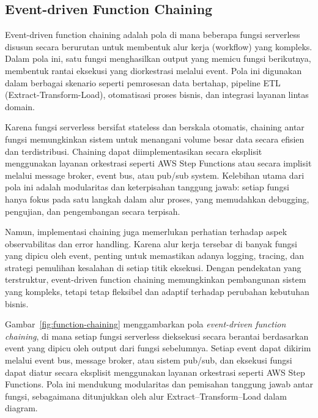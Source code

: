 \subsection{Event-driven Function Chaining}

Event-driven function chaining adalah pola di mana beberapa fungsi serverless disusun secara berurutan untuk membentuk alur kerja (workflow) yang kompleks. Dalam pola ini, satu fungsi menghasilkan output yang memicu fungsi berikutnya, membentuk rantai eksekusi yang diorkestrasi melalui event. Pola ini digunakan dalam berbagai skenario seperti pemrosesan data bertahap, pipeline ETL (Extract-Transform-Load), otomatisasi proses bisnis, dan integrasi layanan lintas domain.

Karena fungsi serverless bersifat stateless dan berskala otomatis, chaining antar fungsi memungkinkan sistem untuk menangani volume besar data secara efisien dan terdistribusi. Chaining dapat diimplementasikan secara eksplisit menggunakan layanan orkestrasi seperti AWS Step Functions atau secara implisit melalui message broker, event bus, atau pub/sub system. Kelebihan utama dari pola ini adalah modularitas dan keterpisahan tanggung jawab: setiap fungsi hanya fokus pada satu langkah dalam alur proses, yang memudahkan debugging, pengujian, dan pengembangan secara terpisah.

Namun, implementasi chaining juga memerlukan perhatian terhadap aspek observabilitas dan error handling. Karena alur kerja tersebar di banyak fungsi yang dipicu oleh event, penting untuk memastikan adanya logging, tracing, dan strategi pemulihan kesalahan di setiap titik eksekusi. Dengan pendekatan yang terstruktur, event-driven function chaining memungkinkan pembangunan sistem yang kompleks, tetapi tetap fleksibel dan adaptif terhadap perubahan kebutuhan bisnis.

Gambar~\ref{fig:function-chaining} menggambarkan pola \textit{event-driven function chaining}, di mana setiap fungsi serverless dieksekusi secara berantai berdasarkan event yang dipicu oleh output dari fungsi sebelumnya. Setiap event dapat dikirim melalui event bus, message broker, atau sistem pub/sub, dan eksekusi fungsi dapat diatur secara eksplisit menggunakan layanan orkestrasi seperti AWS Step Functions. Pola ini mendukung modularitas dan pemisahan tanggung jawab antar fungsi, sebagaimana ditunjukkan oleh alur Extract–Transform–Load dalam diagram.

